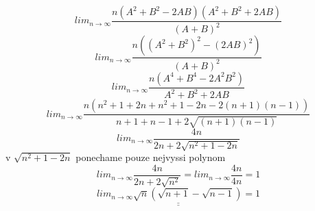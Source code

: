 \documentclass[a4paper]{article}
\def\doubleunderline#1{\underline{\underline{#1}}}
\begin{document}
$$
lim_{n\rightarrow \infty}
\frac
{n (A^2 + B^2 - 2AB) (A^2 + B^2 + 2AB)}
{(A + B)^2}
$$
$$
lim_{n\rightarrow \infty}
\frac
{n \left((A^2+B^2)^2-(2AB)^2\right)}
{(A + B)^2}
$$
$$
lim_{n\rightarrow \infty}
\frac
{n (A^4+B^4-2A^2B^2)}
{A^2+B^2+2AB}
$$
$$
lim_{n\rightarrow \infty}
\frac
{n (n^2+1+2n+n^2+1-2n-2(n+1)(n-1))}
{n+1+n-1+2\sqrt{(n+1)(n-1)}}
$$
$$
lim_{n\rightarrow \infty}
\frac
{4n}
{2n+2\sqrt{n^2+1-2n}}
$$
v $\sqrt{n^2+1-2n}$ ponechame pouze nejvyssi polynom
$$
lim_{n\rightarrow \infty}
\frac
{4n}
{2n+2\sqrt{n^2}}
=lim_{n\rightarrow \infty}\frac{4n}{4n} = 1
$$
$$
\doubleunderline{
	lim_{n\rightarrow \infty} \sqrt{n}\left( \sqrt{n+1} - \sqrt{n-1} \right) = 1
}
$$
\end{document}
